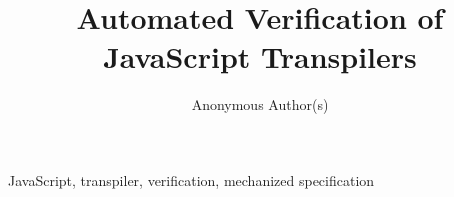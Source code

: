 \documentclass[10pt,conference]{IEEEtran}
\begin{document}
\title{Automated Verification of JavaScript Transpilers}

\author{Anonymous Author(s)}

%
%
%
%

\maketitle



\begin{IEEEkeywords}
  JavaScript,
  transpiler,
  verification,
  mechanized specification
\end{IEEEkeywords}









\balance

\end{document}
